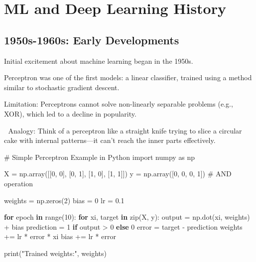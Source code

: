 \documentclass[
  letterpaper,
  DIV=11,
  numbers=noendperiod]{scrreprt}
\newenvironment{Shaded}{\begin{snugshade}}{\end{snugshade}}
\newcommand{\BuiltInTok}[1]{\textcolor[rgb]{0.00,0.23,0.31}{#1}}
\newcommand{\CommentTok}[1]{\textcolor[rgb]{0.37,0.37,0.37}{#1}}
\newcommand{\ControlFlowTok}[1]{\textcolor[rgb]{0.00,0.23,0.31}{\textbf{#1}}}
\newcommand{\DecValTok}[1]{\textcolor[rgb]{0.68,0.00,0.00}{#1}}
\newcommand{\FloatTok}[1]{\textcolor[rgb]{0.68,0.00,0.00}{#1}}
\newcommand{\ImportTok}[1]{\textcolor[rgb]{0.00,0.46,0.62}{#1}}
\newcommand{\KeywordTok}[1]{\textcolor[rgb]{0.00,0.23,0.31}{\textbf{#1}}}
\newcommand{\NormalTok}[1]{\textcolor[rgb]{0.00,0.23,0.31}{#1}}
\newcommand{\OperatorTok}[1]{\textcolor[rgb]{0.37,0.37,0.37}{#1}}
\newcommand{\StringTok}[1]{\textcolor[rgb]{0.13,0.47,0.30}{#1}}
\begin{document}
\section{ML and Deep Learning
History}\label{ml-and-deep-learning-history}

\subsection{1950s-1960s: Early
Developments}\label{s-1960s-early-developments}

Initial excitement about machine learning began in the 1950s.

Perceptron was one of the first models: a linear classifier, trained
using a method similar to stochastic gradient descent.

Limitation: Perceptrons cannot solve non-linearly separable problems
(e.g., XOR), which led to a decline in popularity.

📌 Analogy: Think of a perceptron like a straight knife trying to slice
a circular cake with internal patterns---it can't reach the inner parts
effectively.

\begin{Shaded}
\begin{Highlighting}[]
\CommentTok{\# Simple Perceptron Example in Python}
\ImportTok{import}\NormalTok{ numpy }\ImportTok{as}\NormalTok{ np}

\NormalTok{X }\OperatorTok{=}\NormalTok{ np.array([[}\DecValTok{0}\NormalTok{, }\DecValTok{0}\NormalTok{], [}\DecValTok{0}\NormalTok{, }\DecValTok{1}\NormalTok{], [}\DecValTok{1}\NormalTok{, }\DecValTok{0}\NormalTok{], [}\DecValTok{1}\NormalTok{, }\DecValTok{1}\NormalTok{]])}
\NormalTok{y }\OperatorTok{=}\NormalTok{ np.array([}\DecValTok{0}\NormalTok{, }\DecValTok{0}\NormalTok{, }\DecValTok{0}\NormalTok{, }\DecValTok{1}\NormalTok{])  }\CommentTok{\# AND operation}

\NormalTok{weights }\OperatorTok{=}\NormalTok{ np.zeros(}\DecValTok{2}\NormalTok{)}
\NormalTok{bias }\OperatorTok{=} \DecValTok{0}
\NormalTok{lr }\OperatorTok{=} \FloatTok{0.1}

\ControlFlowTok{for}\NormalTok{ epoch }\KeywordTok{in} \BuiltInTok{range}\NormalTok{(}\DecValTok{10}\NormalTok{):}
    \ControlFlowTok{for}\NormalTok{ xi, target }\KeywordTok{in} \BuiltInTok{zip}\NormalTok{(X, y):}
\NormalTok{        output }\OperatorTok{=}\NormalTok{ np.dot(xi, weights) }\OperatorTok{+}\NormalTok{ bias}
\NormalTok{        prediction }\OperatorTok{=} \DecValTok{1} \ControlFlowTok{if}\NormalTok{ output }\OperatorTok{\textgreater{}} \DecValTok{0} \ControlFlowTok{else} \DecValTok{0}
\NormalTok{        error }\OperatorTok{=}\NormalTok{ target }\OperatorTok{{-}}\NormalTok{ prediction}
\NormalTok{        weights }\OperatorTok{+=}\NormalTok{ lr }\OperatorTok{*}\NormalTok{ error }\OperatorTok{*}\NormalTok{ xi}
\NormalTok{        bias }\OperatorTok{+=}\NormalTok{ lr }\OperatorTok{*}\NormalTok{ error}

\BuiltInTok{print}\NormalTok{(}\StringTok{"Trained weights:"}\NormalTok{, weights)}
\end{Highlighting}
\end{Shaded}
\end{document}
